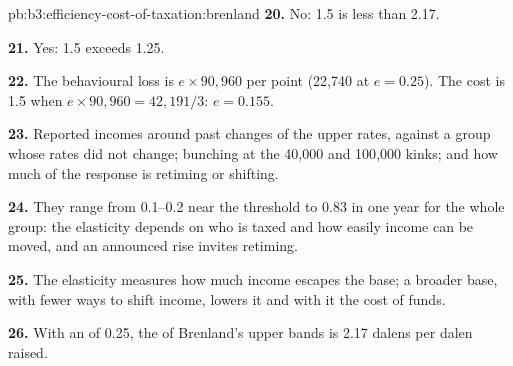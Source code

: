 \begin{solution}{pb:b3:efficiency-cost-of-taxation:brenland}
\textbf{20.} No: 1.5 is less than 2.17.

\textbf{21.} Yes: 1.5 exceeds 1.25.

\textbf{22.} The behavioural loss is $e \times 90{,}960$ per point (22{,}740 at $e = 0.25$). The cost is 1.5 when
$e \times 90{,}960 = 42{,}191/3$: $e = 0.155$.

\textbf{23.} Reported incomes around past changes of the upper rates, against a group
whose rates did not change; bunching at the 40{,}000 and 100{,}000 kinks; and how much
of the response is retiming or shifting.

\textbf{24.} They range from 0.1--0.2 near the threshold to 0.83 in one year for the
whole group: the elasticity depends on who is taxed and how easily income can be
moved, and an announced rise invites retiming.

\textbf{25.} The elasticity measures how much income escapes the base; a broader base,
with fewer ways to shift income, lowers it and with it the cost of funds.

\textbf{26.} With an  of 0.25, the  of Brenland's upper bands is 2.17 dalens per dalen raised.
\end{solution}
